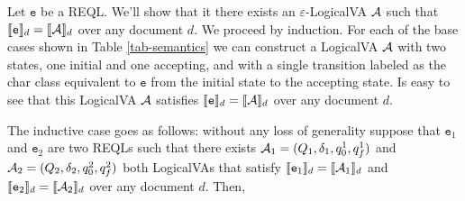 Let $\texttt{e}$ be a REQL. We'll show that it there exists an $\varepsilon$-LogicalVA $\mathcal{A}$ such that $\llbracket\texttt{e}\rrbracket_d = \llbracket\mathcal{A}\rrbracket_d$ over any document $d$.  We proceed by induction. For each of the base cases shown in Table \ref*{tab-semantics} we can construct a LogicalVA $\mathcal{A}$ with two states, one initial and one accepting, and with a single transition labeled as the char class equivalent to $\texttt{e}$ from the initial state to the accepting state. Is easy to see that this LogicalVA $\mathcal{A}$ satisfies $\llbracket\texttt{e}\rrbracket_d = \llbracket\mathcal{A}\rrbracket_d$ over any document $d$.

The inductive case goes as follows: without any loss of generality suppose that $\texttt{e}_1$ and $\texttt{e}_2$ are two REQLs such that there exists $\mathcal{A}_1 = (Q_1, \delta_1, q_0^1, q_f^1)$ and $\mathcal{A}_2 = (Q_2, \delta_2, q_0^2, q_f^2)$ both LogicalVAs that satisfy $\llbracket\texttt{e}_1\rrbracket_d = \llbracket\mathcal{A}_1\rrbracket_d$ and  $\llbracket\texttt{e}_2\rrbracket_d = \llbracket\mathcal{A}_2\rrbracket_d$ over any document $d$. Then,

